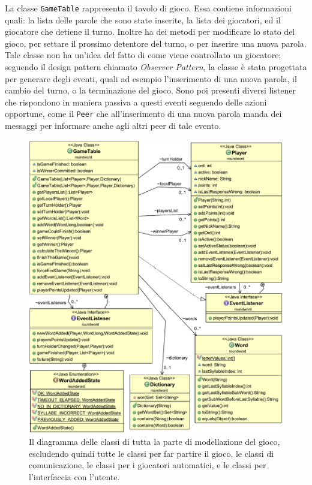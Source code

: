 \documentclass[9pt]{article}
\begin{document}
La classe \texttt{GameTable} rappresenta il tavolo di gioco. Essa contiene informazioni quali: la lista delle parole che sono state inserite, la lista dei giocatori, ed il giocatore che detiene il turno. Inoltre ha dei metodi per modificare lo stato del gioco, per settare il prossimo detentore del turno, o per inserire una nuova parola. Tale classe non ha un'idea del fatto di come viene controllato un giocatore; seguendo il design pattern chiamato \textit{Observer Pattern}, la classe è stata progettata per generare degli eventi, quali ad esempio l'inserimento di una nuova parola, il cambio del turno, o la terminazione del gioco. Sono poi presenti diversi listener che rispondono in maniera passiva a questi eventi seguendo delle azioni opportune, come il \texttt{Peer} che all'inserimento di una nuova parola manda dei messaggi per informare anche agli altri peer di tale evento.

\begin{figure}
	\centering
		\includegraphics[scale=0.8]{imgs/ClassDiagram1.pdf}
		\caption{Il diagramma delle classi di tutta la parte di modellazione del gioco, escludendo quindi tutte le classi per far partire il gioco, le classi di comunicazione, le classi per i giocatori automatici, e le classi per l'interfaccia con l'utente.}
		\label{fig:class_diagram1}
\end{figure}
\end{document}
